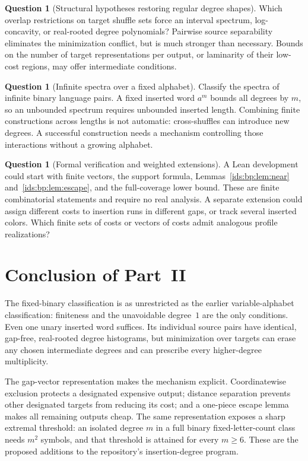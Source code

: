 \documentclass[11pt,letterpaper]{article}
\theoremstyle{definition}\newtheorem{definition}[theorem]{Definition}
\theoremstyle{remark}\newtheorem{remark}[theorem]{Remark}
\theoremstyle{definition}\newtheorem{question}[theorem]{Question}
\begin{document}
\begin{question}[Structural hypotheses restoring regular degree shapes]
\label{ids:bp:q:structure}
Which overlap restrictions on target shuffle sets force an interval spectrum,
log-concavity, or real-rooted degree polynomials? Pairwise source
separability eliminates the minimization conflict, but is much stronger than
necessary. Bounds on the number of target representations per output, or
laminarity of their low-cost regions, may offer intermediate conditions.
\end{question}

\begin{question}[Infinite spectra over a fixed alphabet]
\label{ids:bp:q:infinite}
Classify the spectra of infinite binary language pairs. A fixed inserted
word $a^m$ bounds all degrees by $m$, so an unbounded spectrum requires
unbounded inserted length. Combining finite constructions across lengths is
not automatic: cross-shuffles can introduce new degrees. A successful
construction needs a mechanism controlling those interactions without a
growing alphabet.
\end{question}

\begin{question}[Formal verification and weighted extensions]
\label{ids:bp:q:formal}
A Lean development could start with finite vectors, the support formula,
Lemmas~\ref{ids:bp:lem:near} and~\ref{ids:bp:lem:escape}, and the
full-coverage lower bound. These are finite combinatorial statements and
require no real analysis. A separate extension could assign different costs
to insertion runs in different gaps, or track several inserted colors. Which
finite sets of costs or vectors of costs admit analogous profile
realizations?
\end{question}

\section{Conclusion of Part~II}
\label{ids:bp:sec:conclusion}
The fixed-binary classification is as unrestricted as the earlier
variable-alphabet classification: finiteness and the unavoidable degree~$1$
are the only conditions. Even one unary inserted word suffices. Its individual
source pairs have identical, gap-free, real-rooted degree histograms, but
minimization over targets can erase any chosen intermediate degrees and can
prescribe every higher-degree multiplicity.

The gap-vector representation makes the mechanism explicit. Coordinatewise
exclusion protects a designated expensive output; distance separation prevents
other designated targets from reducing its cost; and a one-piece escape
lemma makes all remaining outputs cheap. The same representation exposes a
sharp extremal threshold: an isolated degree $m$ in a full binary
fixed-letter-count class needs $m^2$ symbols, and that threshold is attained
for every $m\geq6$. These are the proposed additions to the repository's
insertion-degree program.
\end{document}
